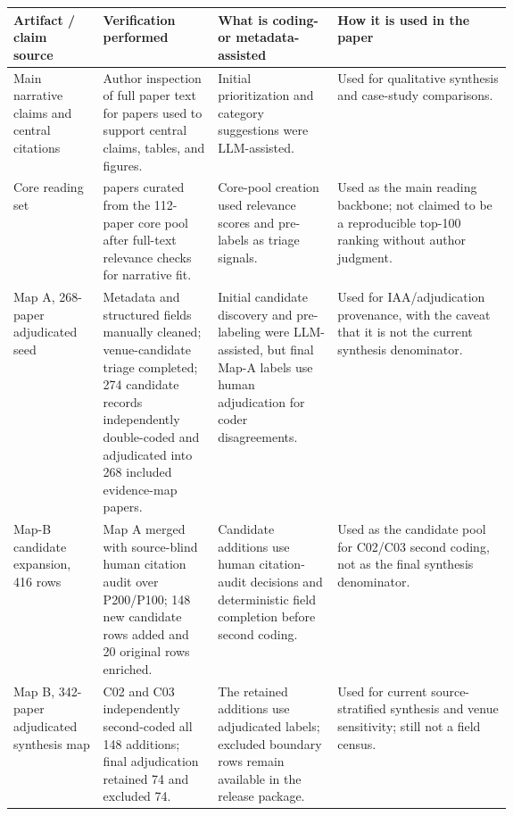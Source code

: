 \documentclass[11pt]{article}
\begin{document}
\begin{table}[t]
\centering
\scriptsize
\renewcommand{\arraystretch}{0.94}
\begin{tabularx}{\linewidth}{>{\raggedright\arraybackslash}p{0.18\linewidth}>{\raggedright\arraybackslash}p{0.23\linewidth}>{\raggedright\arraybackslash}p{0.24\linewidth}X}
\toprule
\textbf{Artifact / claim source} & \textbf{Verification performed} & \textbf{What is coding- or metadata-assisted} & \textbf{How it is used in the paper} \\
\midrule
Main narrative claims and central citations & Author inspection of full paper text for papers used to support central claims, tables, and figures. & Initial prioritization and category suggestions were LLM-assisted. & Used for qualitative synthesis and case-study comparisons. \\
Core reading set & 100 papers curated from the 112-paper core pool after full-text relevance checks for narrative fit. & Core-pool creation used relevance scores and pre-labels as triage signals. & Used as the main reading backbone; not claimed to be a reproducible top-100 ranking without author judgment. \\
Map A, 268-paper adjudicated seed & Metadata and structured fields manually cleaned; venue-candidate triage completed; 274 candidate records independently double-coded and adjudicated into 268 included evidence-map papers. & Initial candidate discovery and pre-labeling were LLM-assisted, but final Map-A labels use human adjudication for coder disagreements. & Used for IAA/adjudication provenance, with the caveat that it is not the current synthesis denominator. \\
Map-B candidate expansion, 416 rows & Map A merged with source-blind human citation audit over P200/P100; 148 new candidate rows added and 20 original rows enriched. & Candidate additions use human citation-audit decisions and deterministic field completion before second coding. & Used as the candidate pool for C02/C03 second coding, not as the final synthesis denominator. \\
Map B, 342-paper adjudicated synthesis map & C02 and C03 independently second-coded all 148 additions; final adjudication retained 74 and excluded 74. & The retained additions use adjudicated labels; excluded boundary rows remain available in the release package. & Used for current source-stratified synthesis and venue sensitivity; still not a field census. \\

\end{tabularx}
\end{table}
\end{document}
